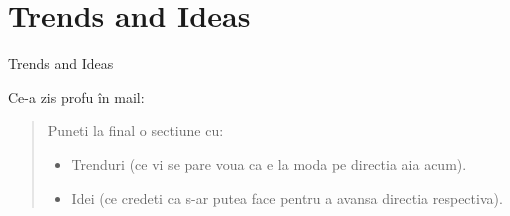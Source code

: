 \section{Trends and Ideas}

\begin{frame}{Trends and Ideas}

Ce-a zis profu în mail:
\begin{quotation}
	 Puneti la final o sectiune cu:
	\begin{itemize}
		\item Trenduri (ce vi se pare voua ca e la moda pe directia aia acum).
		\item Idei (ce credeti ca s-ar putea face pentru a avansa directia respectiva).
	\end{itemize}
	
\end{quotation}

\end{frame}
